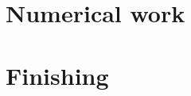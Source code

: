 \documentclass[UKenglish]{texmex/uiomasterthesis}
\begin{document}
\part{Numerical work}




\part{Finishing} %











\backmatter{}




\end{document}
